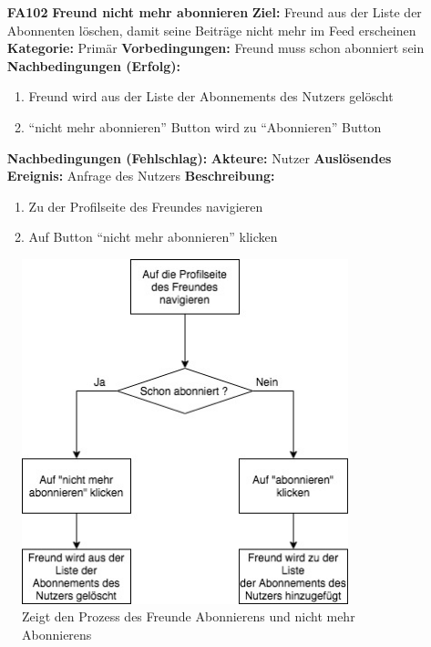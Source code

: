 \documentclass[parskip=full]{scrartcl}
\begin{document}
\begin{itemize}[nosep]
			\item[\textbf{\large FA102}]\textbf{\large Freund nicht mehr abonnieren}
			\newline \textbf{Ziel:} Freund aus der Liste der \gls{Abonnenten} löschen, damit seine Beiträge nicht mehr im \gls{Feed} erscheinen
			\newline \textbf{Kategorie:} Primär
			\newline \textbf{Vorbedingungen:} Freund muss schon abonniert sein
			\newline \textbf{Nachbedingungen (Erfolg):} 
			\begin{enumerate}[nosep]
				\item Freund wird aus der Liste der \gls{Abonnements} des Nutzers gelöscht
				\item “nicht mehr abonnieren” \gls{Button} wird zu “Abonnieren” \gls{Button}
			\end{enumerate}
			\textbf{Nachbedingungen (Fehlschlag):}
			\newline \textbf{Akteure:} Nutzer
			\newline \textbf{Auslösendes Ereignis:} Anfrage des Nutzers
			\newline \textbf{Beschreibung:}
			\begin{enumerate}[nosep]
				\item Zu der Profilseite des Freundes navigieren
				\item Auf \gls{Button} “nicht mehr abonnieren” klicken
			\end{enumerate}
		\end{itemize}
		
			\begin{figure}[H]
				\centering
				\includegraphics[height=10cm]{Freundediagramm}
				\caption{Zeigt den Prozess des Freunde Abonnierens und nicht mehr Abonnierens}
				\label{Freundediagramm}
			\end{figure}
		
\end{document}
